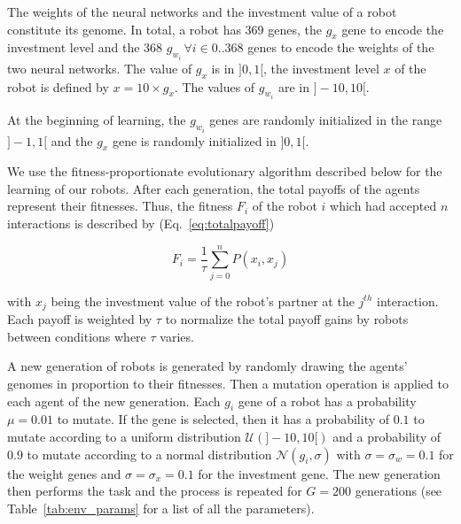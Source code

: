 The weights of the neural networks and the investment value of a robot constitute its genome. In total, a robot has $369$ genes, the $g_x$ gene to encode the investment level and the 368 $g_{w_i}\,\forall i \in 0..368$ genes to encode the weights of the two neural networks. The value of $g_x$ is in $]0, 1[$, the investment level $x$ of the robot is defined by $x = 10 \times g_x$. The values of $g_{w_i}$ are in $]-10, 10[$.

At the beginning of learning, the $g_{w_i}$ genes are randomly initialized in the range $]-1, 1[$ and the $g_x$ gene is randomly initialized in $]0, 1[$.

We use the fitness-proportionate evolutionary algorithm described below for the learning of our robots. After each generation, the total payoffs of the agents represent their fitnesses. Thus, the fitness $F_i$ of the robot $i$  which had accepted $n$ interactions is described by (Eq.~\ref{eq:totalpayoff})


\begin{equation}
    F_i = \frac{1}{\tau} \sum_{j=0}^{n} P(x_i, x_j) \label{eq:totalpayoff}
\end{equation}  

with $x_j$ being the investment value of the robot's partner at the $j^{th}$ interaction. Each payoff is weighted by $\tau$ to normalize the total payoff gains by robots between conditions where $\tau$ varies.

A new generation of robots is generated by randomly drawing the agents' genomes in proportion to their fitnesses. Then a mutation operation is applied to each agent of the new generation. Each $g_i$ gene of a robot has a probability $\mu = 0.01$ to mutate. If the gene is selected, then it has a probability of $0.1$ to mutate according to a uniform distribution $\mathcal{U}(]-10, 10[)$ and a probability of $0.9$ to mutate according to a normal distribution $\mathcal{N}(g_i, \sigma)$ with $\sigma = \sigma_w = 0.1$ for the weight genes and $\sigma = \sigma_x = 0.1$ for the investment gene. The new generation then performs the task and the process is repeated for $G = 200$ generations (see Table~\ref{tab:env_params} for a list of all the parameters). 

